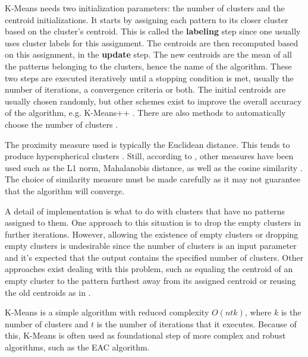 K-Means needs two initialization parameters: the number of clusters and the centroid initializations.
It starts by assigning each pattern to its closer cluster based on the cluster's centroid.
This is called the \textbf{labeling} step since one usually uses cluster labels for this assignment.
The centroids are then recomputed based on this assignment, in the \textbf{update} step.
The new centroids are the mean of all the patterns belonging to the clusters, hence the name of the algorithm.
These two steps are executed iteratively until a stopping condition is met, usually the number of iterations, a convergence criteria or both.
The initial centroids are usually chosen randomly, but other schemes exist to improve the overall accuracy of the algorithm, e.g. K-Means++ \cite{Arthur2007}.
There are also methods to automatically choose the number of clusters \cite{Aggarwal2014}.

The proximity measure used is typically the Euclidean distance.
This tends to produce hyperspherical clusters \cite{Jain1999}.
Still, according to \cite{Jain2010}, other measures have been used such as the L1 norm, Mahalanobis distance, as well as the cosine similarity \cite{Aggarwal2014}.
The choice of similarity measure must be made carefully as it may not guarantee that the algorithm will converge.

A detail of implementation is what to do with clusters that have no patterns assigned to them.
One approach to this situation is to drop the empty clusters in further iterations.
However, allowing the existence of empty clusters or dropping empty clusters is undesirable since the number of clusters is an input parameter and it's expected that the output contains the specified number of clusters.
Other approaches exist dealing with this problem, such as equaling the centroid of an empty cluster to the pattern furthest away from its assigned centroid or reusing the old centroids as in \cite{Pakhira2009}.

K-Means is a simple algorithm with reduced complexity $O(ntk)$, where $k$ is the number of clusters and $t$ is the number of iterations that it executes.
Because of this, K-Means is often used as foundational step of more complex and robust algorithms, such as the EAC algorithm.


